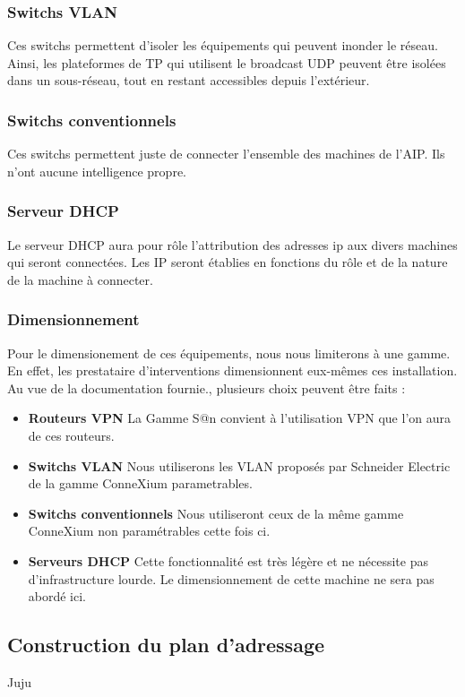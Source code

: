 \documentclass[a4paper]{article}
\begin{document}
	\subsubsection{Switchs VLAN}
Ces switchs permettent d'isoler les équipements qui peuvent inonder le réseau. Ainsi, les plateformes de TP qui utilisent le broadcast UDP peuvent être isolées dans un sous-réseau, tout en restant accessibles depuis l'extérieur.
	
	\subsubsection{Switchs conventionnels}
Ces switchs permettent juste de connecter l'ensemble des machines de l'AIP. Ils n'ont aucune intelligence propre.
	
	\subsubsection{Serveur DHCP}
Le serveur DHCP aura pour rôle l'attribution des adresses ip aux divers machines qui seront connectées. Les IP seront établies en fonctions du rôle et de la nature de la machine à connecter.

	\subsubsection{Dimensionnement}
Pour le dimensionement de ces équipements, nous nous limiterons à une gamme. En effet, les prestataire d'interventions dimensionnent eux-mêmes ces installation.\\
Au vue de la documentation fournie., plusieurs choix peuvent être faits : 
\begin{itemize}
	\item \textbf{Routeurs VPN} La Gamme S@n convient à l'utilisation VPN que l'on aura de ces routeurs.
	\item \textbf{Switchs VLAN} Nous utiliserons les VLAN proposés par Schneider Electric de la gamme ConneXium parametrables. 
	\item \textbf{Switchs conventionnels} Nous utiliseront ceux de la même gamme ConneXium non paramétrables cette fois ci. 
	\item \textbf{Serveurs DHCP} Cette fonctionnalité est très légère et ne nécessite pas d'infrastructure lourde. Le dimensionnement de cette machine ne sera pas abordé ici.
\end{itemize}
	
	\subsection{Construction du plan d'adressage}
	Juju
	
\end{document}
